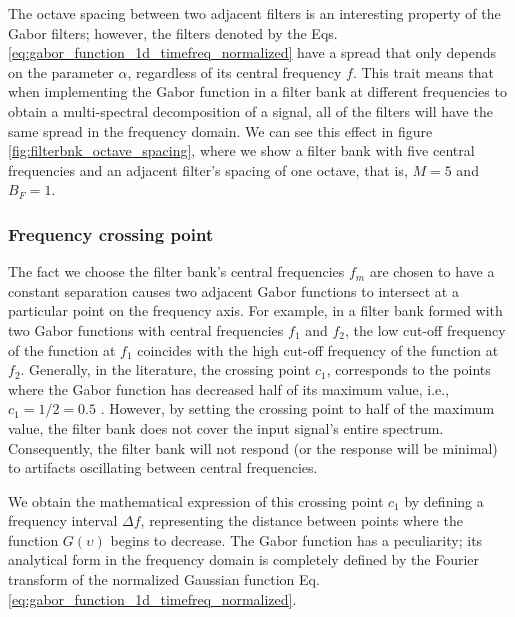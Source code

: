 The octave spacing between two adjacent filters is an interesting property of the Gabor filters; however, the filters denoted by the Eqs. \eqref{eq:gabor_function_1d_timefreq_normalized} have a spread that only depends on the parameter $\alpha$, regardless of its central frequency $f$. This trait means that when implementing the Gabor function in a filter bank at different frequencies to obtain a multi-spectral decomposition of a signal, all of the filters will have the same spread in the frequency domain. We can see this effect in figure \ref{fig:filterbnk_octave_spacing}, where we show a filter bank with five central frequencies and an adjacent filter's spacing of one octave, that is, $M=5$ and $B_F = 1$. 


\subsubsection{Frequency crossing point}
The fact we choose the filter bank's central frequencies $f_m$ are chosen to have a constant separation causes two adjacent Gabor functions to intersect at a particular point on the frequency axis. For example, in a filter bank formed with two Gabor functions with central frequencies $f_1$ and $f_2$, the low cut-off frequency of the function at $f_1$ coincides with the high cut-off frequency of the function at $f_2$. Generally, in the literature, the crossing point $c_1$, corresponds to the points where the Gabor function has decreased half of its maximum value, i.e., $c_1= 1/2=0.5$ \citep{Granlund:CGIP:1978}. However, by setting the crossing point to half of the maximum value, the filter bank does not cover the input signal's entire spectrum. Consequently, the filter bank will not respond (or the response will be minimal) to artifacts oscillating between central frequencies.

We obtain the mathematical expression of this crossing point $c_1$ by defining a frequency interval $\Delta f$, representing the distance between points where the function $G(\upsilon)$ begins to decrease. The Gabor function has a peculiarity;  its analytical form in the frequency domain is completely defined by the Fourier transform of the normalized Gaussian function Eq. \eqref{eq:gabor_function_1d_timefreq_normalized}.

